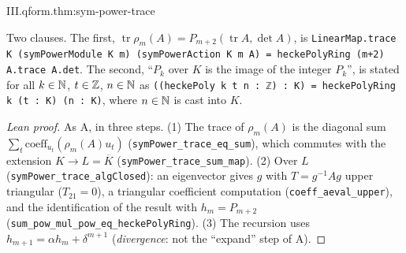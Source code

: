 \begin{theorem}
\end{theorem}
\begin{tfformal}{III.qform.thm:sym-power-trace}
\begin{tffidelity}
Two clauses. The first, $\operatorname{tr}\rho_m(A)=P_{m+2}(\operatorname{tr}A,\det A)$, is \texttt{LinearMap.trace K (symPowerModule K m) (symPowerAction K m A) = heckePolyRing (m+2) A.trace A.det}. The second, ``$P_k$ over $K$ is the image of the integer $P_k$'', is stated for all $k\in\mathbb{N}$, $t\in\mathbb{Z}$, $n\in\mathbb{N}$ as \texttt{((heckePoly k t n : ℤ) : K) = heckePolyRing k (t : K) (n : K)}, where $n\in\mathbb{N}$ is cast into $K$.
\end{tffidelity}
\end{tfformal}
\begin{proof}[Lean proof]
As A, in three steps. (1) The trace of $\rho_m(A)$ is the diagonal sum $\sum_t\mathrm{coeff}_{u_t}(\rho_m(A)u_t)$ (\texttt{symPower\_trace\_eq\_sum}), which commutes with the extension $K\to L=\overline K$ (\texttt{symPower\_trace\_sum\_map}). (2) Over $L$ (\texttt{symPower\_trace\_algClosed}): an eigenvector gives $g$ with $T=g^{-1}Ag$ upper triangular ($T_{21}=0$), a triangular coefficient computation (\texttt{coeff\_aeval\_upper}), and the identification of the result with $h_m=P_{m+2}$ (\texttt{sum\_pow\_mul\_pow\_eq\_heckePolyRing}). (3) The recursion uses $h_{m+1}=\alpha h_m+\delta^{m+1}$ (\emph{divergence}: not the ``expand'' step of A).
\end{proof}

